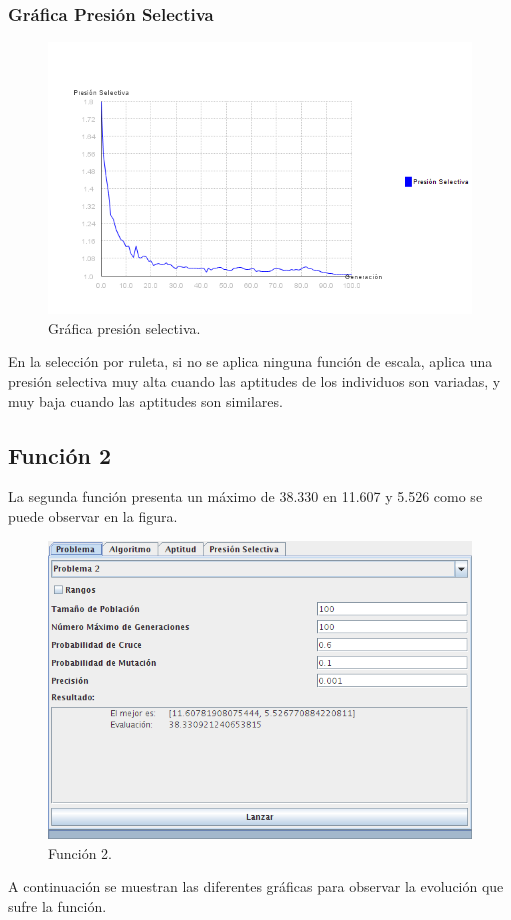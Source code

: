 \documentclass[12pt]{article}
\begin{document}
\subsubsection*{Gráfica Presión Selectiva}
\begin{figure}[H]
\centering
\includegraphics[scale=0.4]{graficas/F1inicial_presion}
\caption{Gráfica presión selectiva.}
\label{fig}
\end{figure}
	En la selección por ruleta, si no se aplica ninguna función de escala, aplica una presión selectiva muy alta cuando las aptitudes de los individuos son variadas, y muy baja cuando las aptitudes son similares.
\newpage

\subsection{Función 2}
	La segunda función presenta un máximo de 38.330 en 11.607 y 5.526 como se puede observar en la figura.
\begin{figure}[H]
\centering
\includegraphics[scale=0.4]{graficas/F2inicial}
\caption{Función 2.}
\label{fig}
\end{figure}
	A continuación se muestran las diferentes gráficas para observar la evolución que sufre la función.
\end{document}
